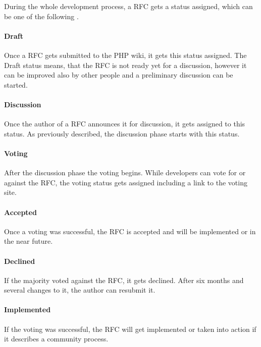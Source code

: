 During the whole development process, a \ac{RFC} gets a status assigned, which
can be one of the following \cite{PHPRFC}.

\paragraph{Draft}

Once a \ac{RFC} gets submitted to the PHP wiki, it gets this status assigned.
The Draft status means, that the \ac{RFC} is not ready yet for a discussion,
however it can be improved also by other people and a preliminary discussion
can be started.

\paragraph{Discussion}

Once the author of a \ac{RFC} announces it for discussion, it gets assigned to
this status. As previously described, the discussion phase starts with this
status.

\paragraph{Voting}

After the discussion phase the voting begins. While developers can vote for or
against the \ac{RFC}, the voting status gets assigned including a link to the
voting site.

\paragraph{Accepted}

Once a voting was successful, the \ac{RFC} is accepted and will be implemented
or in the near future.

\paragraph{Declined}

If the majority voted against the \ac{RFC}, it gets declined. After six months
and several changes to it, the author can resubmit it.

\paragraph{Implemented}

If the voting was successful, the \ac{RFC} will get implemented or taken into
action if it describes a community process.

